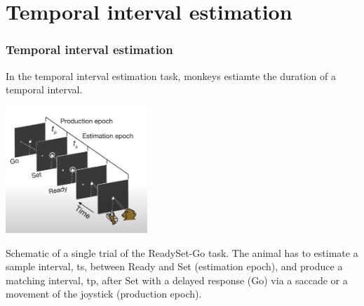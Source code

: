 \documentclass{beamer}
\begin{document}
\section{Temporal interval estimation}
\begin{frame}
\frametitle{\textbf{Temporal interval estimation} }

In the temporal interval estimation task, monkeys estiamte the duration of a temporal interval.


\centering
\begin{minipage}{1\textwidth}
    \centering
    \includegraphics[width=0.4\textwidth]{images/Sohn_et_al-2019_01.PNG} %
\end{minipage}

Schematic of a single trial of the ReadySet-Go task. The animal has to estimate a sample interval, ts, between Ready and Set (estimation epoch), and produce a matching interval, tp, after Set with a delayed response (Go) via a saccade or a movement of the joystick (production epoch).

\end{frame}

\end{document}
